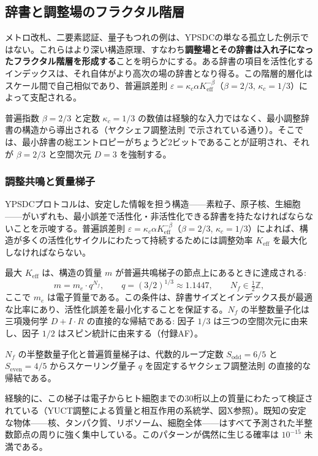 \documentclass[12pt,a4paper]{article}
\theoremstyle{definition}
\theoremstyle{remark}
\begin{document}
	\subsection{辞書と調整場のフラクタル階層}
	\label{subsec:fractal-hierarchy}
	
	メトロ改札、二要素認証、量子もつれの例は、YPSDCの単なる孤立した例示ではない。これらはより深い構造原理、すなわち\textbf{調整場とその辞書は入れ子になったフラクタル階層を形成する}ことを明らかにする。ある辞書の項目を活性化するインデックスは、それ自体がより高次の場の辞書となり得る。この階層的層化はスケール間で自己相似であり、普遍誤差則 $\varepsilon = \kappa_c \alpha K_{\mathrm{eff}}^{-\beta}$（$\beta=2/3$, $\kappa_c=1/3$）によって支配される。
	
	普遍指数 $\beta = 2/3$ と定数 $\kappa_c = 1/3$ の数値は経験的な入力ではなく、最小調整辞書の構造から導出される（ヤクシェフ調整法則 \cite{YakushevLaw2026} で示されている通り）。そこでは、最小辞書の総エントロピーがちょうど2ビットであることが証明され、それが $\beta = 2/3$ と空間次元 $D = 3$ を強制する。
	
	\subsubsection{調整共鳴と質量梯子}
	
	YPSDCプロトコルは、安定した情報を担う構造——素粒子、原子核、生細胞——がいずれも、最小誤差で活性化・非活性化できる辞書を持たなければならないことを示唆する。普遍誤差則 $\varepsilon = \kappa_c\alpha K_{\mathrm{eff}}^{-\beta}$（$\beta = 2/3$, $\kappa_c = 1/3$）によれば、構造が多くの活性化サイクルにわたって持続するためには調整効率 $K_{\mathrm{eff}}$ を最大化しなければならない。
	
	最大 $K_{\mathrm{eff}}$ は、構造の質量 $m$ が普遍共鳴梯子の節点上にあるときに達成される:
	\[
	m = m_e \cdot q^{N_f}, \qquad
	q = (3/2)^{1/3} \approx 1.1447, \qquad N_f \in \tfrac{1}{2}\mathbb{Z},
	\]
	ここで $m_e$ は電子質量である。この条件は、辞書サイズとインデックス長が最適な比率にあり、活性化誤差を最小化することを保証する。$N_f$ の半整数量子化は三項幾何学 $D+I\!\cdot\!R$ の直接的な帰結である: 因子 $1/3$ は三つの空間次元に由来し、因子 $1/2$ はスピン統計に由来する（付録AF）。
	
	$N_f$ の半整数量子化と普遍質量梯子は、代数的ループ定数 $S_{\mathrm{odd}} = 6/5$ と $S_{\mathrm{even}} = 4/5$ からスケーリング量子 $q$ を固定するヤクシェフ調整法則 \cite{YakushevLaw2026} の直接的な帰結である。
	
	経験的に、この梯子は電子からヒト細胞までの30桁以上の質量にわたって検証されている（YUCT調整による質量と相互作用の系統学、図X参照）。既知の安定な物体——核、タンパク質、リボソーム、細胞全体——はすべて予測された半整数節点の周りに強く集中している。このパターンが偶然に生じる確率は $10^{-15}$ 未満である。
	
\end{document}

